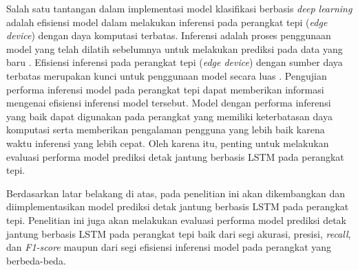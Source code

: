 Salah satu tantangan dalam implementasi model klasifikasi berbasis \textit{deep learning} adalah efisiensi model dalam melakukan inferensi pada perangkat tepi (\textit{edge device}) dengan daya komputasi terbatas.
Inferensi adalah proses penggunaan model yang telah dilatih sebelumnya untuk melakukan prediksi pada data yang baru \parencite{AIInferenceVs}.
Efisiensi inferensi pada perangkat tepi (\textit{edge device}) dengan sumber daya terbatas merupakan kunci untuk penggunaan model secara luas \parencite{ulkerReviewingInferencePerformance2020}.
Pengujian performa inferensi model pada perangkat tepi dapat memberikan informasi mengenai efisiensi inferensi model tersebut.
Model dengan performa inferensi yang baik dapat digunakan pada perangkat yang memiliki keterbatasan daya komputasi serta memberikan pengalaman pengguna yang lebih baik karena waktu inferensi yang lebih cepat.
Oleh karena itu, penting untuk melakukan evaluasi performa model prediksi detak jantung berbasis LSTM pada perangkat tepi.

Berdasarkan latar belakang di atas, pada penelitian ini akan dikembangkan dan diimplementasikan model prediksi detak jantung berbasis LSTM pada perangkat tepi.
Penelitian ini juga akan melakukan evaluasi performa model prediksi detak jantung berbasis LSTM pada perangkat tepi baik dari segi akurasi, presisi, \emph{recall}, dan \emph{F1-score} maupun dari segi efisiensi inferensi model pada perangkat yang berbeda-beda.





